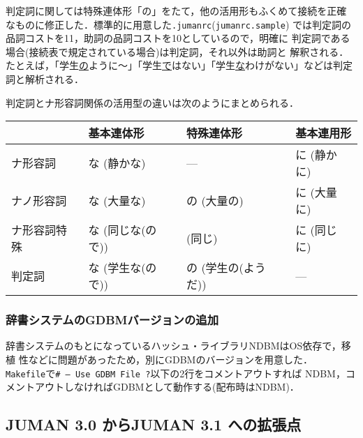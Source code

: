 \documentclass[a4j,titlepage]{jarticle}
\begin{document}
判定詞に関しては特殊連体形「の」をたて，他の活用形もふくめて接続を正確
なものに修正した．標準的に用意した{\tt .jumanrc}({\tt jumanrc.sample})
では判定詞の品詞コストを11，助詞の品詞コストを10としているので，明確に
判定詞である場合(接続表で規定されている場合)は判定詞，それ以外は助詞と
解釈される．たとえば，「学生\underline{の}ように〜」「学生\underline
{で}はない」「学生\underline {な}わけがない」などは判定詞と解析される．

判定詞とナ形容詞関係の活用型の違いは次のようにまとめられる．
\begin{center}
\begin{tabular}{llll} \hline
             & 基本連体形        & 特殊連体形          & 基本連用形 \\ \hline
ナ形容詞     & な (静かな)       & ---                 & に (静かに) \\
ナノ形容詞   & な (大量な)       & の (大量の)         & に (大量に) \\
ナ形容詞特殊 & な (同じな(ので)) & {\tt *} (同じ)      & に (同じに) \\
判定詞       & な (学生な(ので)) & の (学生の(ようだ)) & ---         \\ \hline
\end{tabular}
\end{center}

\subsubsection{辞書システムのGDBMバージョンの追加}

辞書システムのもとになっているハッシュ・ライブラリNDBMはOS依存で，移植
性などに問題があったため，別にGDBMのバージョンを用意した．{\tt
Makefile}で{\tt \# --- Use GDBM File ?}以下の2行をコメントアウトすれば
NDBM，コメントアウトしなければGDBMとして動作する(配布時はNDBM)．

\subsection{JUMAN 3.0 からJUMAN 3.1 への拡張点}
\end{document}
